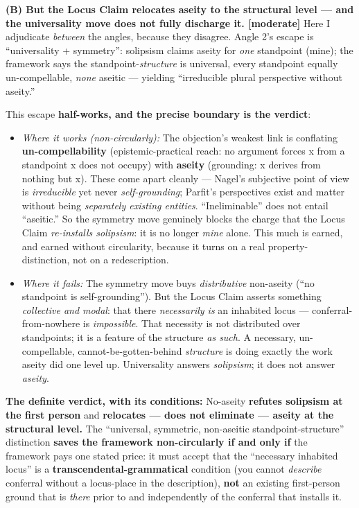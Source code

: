 \documentclass[11pt]{article}
\begin{document}
\textbf{(B) But the Locus Claim relocates aseity to the structural level — and the universality move does not fully discharge it. [moderate]} Here I adjudicate \emph{between} the angles, because they disagree. Angle 2's escape is ``universality + symmetry'': solipsism claims aseity for \emph{one} standpoint (mine); the framework says the standpoint-\emph{structure} is universal, every standpoint equally un-compellable, \emph{none} aseitic — yielding ``irreducible plural perspective without aseity.''

This escape \textbf{half-works, and the precise boundary is the verdict}:

\begin{itemize}
\item \emph{Where it works (non-circularly):} The objection's weakest link is conflating \textbf{un-compellability} (epistemic-practical reach: no argument forces x from a standpoint x does not occupy) with \textbf{aseity} (grounding: x derives from nothing but x). These come apart cleanly — Nagel's subjective point of view is \emph{irreducible} yet never \emph{self-grounding}; Parfit's perspectives exist and matter without being \emph{separately existing entities}. ``Ineliminable'' does not entail ``aseitic.'' So the symmetry move genuinely blocks the charge that the Locus Claim \emph{re-installs solipsism}: it is no longer \emph{mine} alone. This much is earned, and earned without circularity, because it turns on a real property-distinction, not on a redescription.
\item \emph{Where it fails:} The symmetry move buys \emph{distributive} non-aseity (``no standpoint is self-grounding''). But the Locus Claim asserts something \emph{collective and modal}: that there \emph{necessarily is} an inhabited locus — conferral-from-nowhere is \emph{impossible}. That necessity is not distributed over standpoints; it is a feature of the structure \emph{as such}. A necessary, un-compellable, cannot-be-gotten-behind \emph{structure} is doing exactly the work aseity did one level up. Universality answers \emph{solipsism}; it does not answer \emph{aseity}.
\end{itemize}

\textbf{The definite verdict, with its conditions:} No-aseity \textbf{refutes solipsism at the first person} and \textbf{relocates — does not eliminate — aseity at the structural level.} The ``universal, symmetric, non-aseitic standpoint-structure'' distinction \textbf{saves the framework non-circularly if and only if} the framework pays one stated price: it must accept that the ``necessary inhabited locus'' is a \textbf{transcendental-grammatical} condition (you cannot \emph{describe} conferral without a locus-place in the description), \textbf{not} an existing first-person ground that is \emph{there} prior to and independently of the conferral that installs it.
\end{document}
